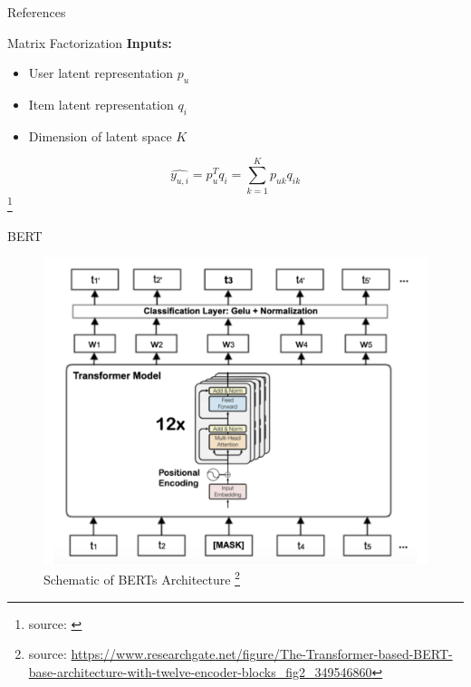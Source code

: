 \documentclass[en]{sdqbeamer}
\newcommand\blfootnote[1]{%
  \begingroup
  \renewcommand\thefootnote{}\footnote{#1}%
  \addtocounter{footnote}{-1}%
  \endgroup
}
\begin{document}
\appendix
\beginbackup
\begin{frame}{References}
	\printbibliography
\end{frame}

\begin{frame}{Matrix Factorization}
	\textbf{Inputs:}
	\begin{itemize}
		\item User latent representation $p_u$
		\item Item latent representation $q_i$
		\item Dimension of latent space $K$
	\end{itemize}
	$$\hat{y_{u,i}} = p_u^T q_i = \sum_{k=1}^{K}p_{uk}q_{ik}$$
	\blfootnote{source: \cite{heNeuralCollaborativeFiltering2017}}
\end{frame}

\begin{frame}{BERT}
	\begin{figure}
		\includegraphics[height=0.5\textheight]{images/The-Transformer-based-BERT-base-architecture-with-twelve-encoder-blocks.pdf}
		\caption{Schematic of BERTs Architecture \footnote{source: \href{https://www.researchgate.net/figure/The-Transformer-based-BERT-base-architecture-with-twelve-encoder-blocks\_fig2\_349546860}{https://www.researchgate.net/figure/The-Transformer-based-BERT-base-architecture-with-twelve-encoder-blocks\_fig2\_349546860}}}
	\end{figure}
	
\end{frame}
\end{document}
